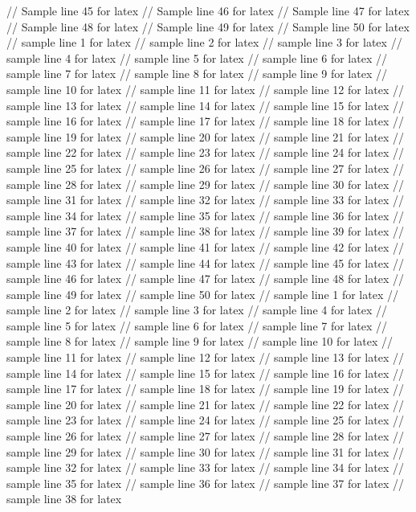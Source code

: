 // Sample line 45 for latex
// Sample line 46 for latex
// Sample line 47 for latex
// Sample line 48 for latex
// Sample line 49 for latex
// Sample line 50 for latex
// sample line 1 for latex
// sample line 2 for latex
// sample line 3 for latex
// sample line 4 for latex
// sample line 5 for latex
// sample line 6 for latex
// sample line 7 for latex
// sample line 8 for latex
// sample line 9 for latex
// sample line 10 for latex
// sample line 11 for latex
// sample line 12 for latex
// sample line 13 for latex
// sample line 14 for latex
// sample line 15 for latex
// sample line 16 for latex
// sample line 17 for latex
// sample line 18 for latex
// sample line 19 for latex
// sample line 20 for latex
// sample line 21 for latex
// sample line 22 for latex
// sample line 23 for latex
// sample line 24 for latex
// sample line 25 for latex
// sample line 26 for latex
// sample line 27 for latex
// sample line 28 for latex
// sample line 29 for latex
// sample line 30 for latex
// sample line 31 for latex
// sample line 32 for latex
// sample line 33 for latex
// sample line 34 for latex
// sample line 35 for latex
// sample line 36 for latex
// sample line 37 for latex
// sample line 38 for latex
// sample line 39 for latex
// sample line 40 for latex
// sample line 41 for latex
// sample line 42 for latex
// sample line 43 for latex
// sample line 44 for latex
// sample line 45 for latex
// sample line 46 for latex
// sample line 47 for latex
// sample line 48 for latex
// sample line 49 for latex
// sample line 50 for latex
// sample line 1 for latex
// sample line 2 for latex
// sample line 3 for latex
// sample line 4 for latex
// sample line 5 for latex
// sample line 6 for latex
// sample line 7 for latex
// sample line 8 for latex
// sample line 9 for latex
// sample line 10 for latex
// sample line 11 for latex
// sample line 12 for latex
// sample line 13 for latex
// sample line 14 for latex
// sample line 15 for latex
// sample line 16 for latex
// sample line 17 for latex
// sample line 18 for latex
// sample line 19 for latex
// sample line 20 for latex
// sample line 21 for latex
// sample line 22 for latex
// sample line 23 for latex
// sample line 24 for latex
// sample line 25 for latex
// sample line 26 for latex
// sample line 27 for latex
// sample line 28 for latex
// sample line 29 for latex
// sample line 30 for latex
// sample line 31 for latex
// sample line 32 for latex
// sample line 33 for latex
// sample line 34 for latex
// sample line 35 for latex
// sample line 36 for latex
// sample line 37 for latex
// sample line 38 for latex
